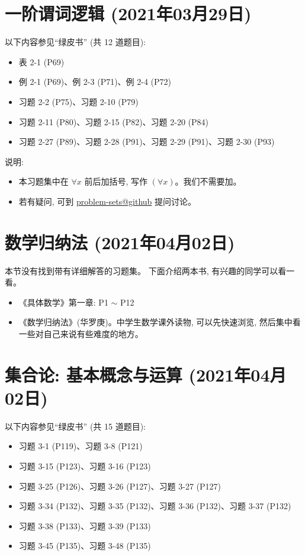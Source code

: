 \documentclass{article}
\begin{document}
\section{一阶谓词逻辑 (2021年03月29日)}

以下内容参见``绿皮书'' (共 12 道题目):
\begin{itemize}
  \item 表 2-1 (P69)
  \item 例 2-1 (P69)、例 2-3 (P71)、例 2-4 (P72)
  \item 习题 2-2 (P75)、习题 2-10 (P79)
  \item 习题 2-11 (P80)、习题 2-15 (P82)、习题 2-20 (P84)
  \item 习题 2-27 (P89)、习题 2-28 (P91)、习题 2-29 (P91)、习题 2-30 (P93)
\end{itemize}

说明:
\begin{itemize}
  \item 本习题集中在 $\forall x$ 前后加括号, 写作 $(\forall x)$。我们不需要加。
  \item 若有疑问, 可到 \href{https://github.com/courses-at-nju-by-hfwei/discrete-math-problem-sets/discussions}{problem-sets@github} 提问讨论。
\end{itemize}
\section{数学归纳法 (2021年04月02日)}

本节没有找到带有详细解答的习题集。
下面介绍两本书, 有兴趣的同学可以看一看。
\begin{itemize}
  \item《具体数学》第一章: P1 $\sim$ P12
  \item《数学归纳法》(华罗庚)。中学生数学课外读物, 可以先快速浏览, 然后集中看一些对自己来说有些难度的地方。
\end{itemize}
\section{集合论: 基本概念与运算 (2021年04月02日)}

以下内容参见``绿皮书'' (共 15 道题目):
\begin{itemize}
  \item 习题 3-1 (P119)、习题 3-8 (P121)
  \item 习题 3-15 (P123)、习题 3-16 (P123)
  \item 习题 3-25 (P126)、习题 3-26 (P127)、习题 3-27 (P127)
  \item 习题 3-34 (P132)、习题 3-35 (P132)、习题 3-36 (P132)、习题 3-37 (P132)
  \item 习题 3-38 (P133)、习题 3-39 (P133)
  \item 习题 3-45 (P135)、习题 3-48 (P135)
\end{itemize}
\end{document}
